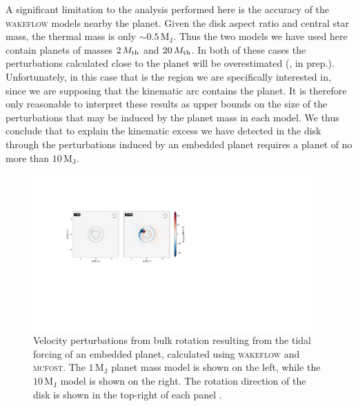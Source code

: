 A significant limitation to the analysis performed here is the accuracy of the \textsc{wakeflow} models nearby the planet.
Given the disk aspect ratio and central star mass, the thermal mass is only $\sim 0.5 \, \mathrm{M_J}$.
Thus the two models we have used here contain planets of masses $2 \, M_{\rm th}$ and $20 \, M_{\rm th}$.
In both of these cases the perturbations calculated close to the planet will be overestimated (\citeauthor{fasanoinprep.}, in prep.).
Unfortunately, in this case that is the region we are specifically interested in, since we are supposing that the kinematic arc contains the planet.
It is therefore only reasonable to interpret these results as upper bounds on the size of the perturbations that may be induced by the planet mass in each model.
We thus conclude that to explain the kinematic excess we have detected in the disk through the perturbations induced by an embedded planet requires a planet of no more than $10 \, \mathrm{M_J}$.
\begin{figure}
    \centering
    \includegraphics[width = 0.95\textwidth]{figures/garg_analytics_cw.pdf}
    \caption{Velocity perturbations from bulk rotation resulting from the tidal forcing of an embedded planet, calculated using \textsc{wakeflow} and \textsc{mcfost}. The $1 \, \mathrm{M_J}$ planet mass model is shown on the left, while the $10 \, \mathrm{M_J}$ model is shown on the right. The rotation direction of the disk is shown in the top-right of each panel \citep{garg2022}.}
    \label{fig:garg_analytics}
\end{figure}